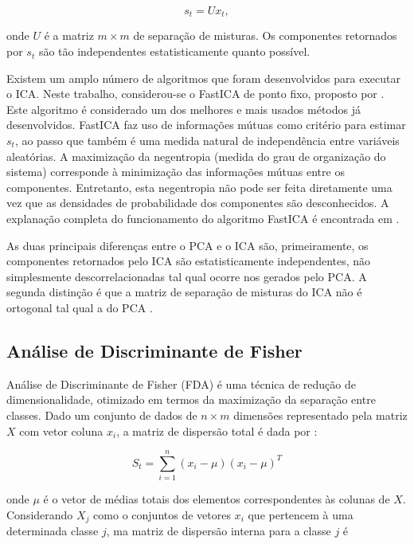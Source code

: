 \begin{equation}\label{eq:ica1}
{s_t} = {U}{x_t},
\end{equation}

\noindent onde $U$ é a matriz $m \times m$ de separação de misturas. Os componentes retornados por $s_t$ são tão independentes estatisticamente quanto possível.

Existem um amplo número de algoritmos que foram desenvolvidos para executar o ICA. Neste trabalho, considerou-se o FastICA de ponto fixo, proposto por . Este algoritmo é considerado um dos melhores e mais usados métodos já desenvolvidos. FastICA faz uso de informações mútuas como critério para estimar $s_t$, ao passo que também é uma medida natural de independência entre variáveis aleatórias. A maximização da negentropia (medida do grau de organização do sistema) corresponde à minimização das informações mútuas entre os componentes. Entretanto, esta negentropia não pode ser feita diretamente uma vez que as densidades de probabilidade dos componentes são desconhecidos. A explanação completa do funcionamento do algoritmo FastICA é encontrada em \cite{koldovsky2006efficient}.

As duas principais diferenças entre o PCA e o ICA são, primeiramente, os componentes retornados pelo ICA são estatisticamente independentes, não simplesmente descorrelacionadas tal qual ocorre nos gerados pelo PCA. A segunda distinção é que a matriz  de separação de misturas do ICA não é ortogonal tal qual a do PCA \cite{cao2003comparison}.

\subsection{Análise de Discriminante de Fisher}

Análise de Discriminante de Fisher (FDA) é uma técnica de redução de dimensionalidade, otimizado em termos da maximização da separação entre classes. Dado um conjunto de dados de $n \times m$ dimensões representado pela matriz $X$ com vetor coluna $x_i$, a matriz de dispersão total é dada por \cite{CHIANG20041389}:

\begin{equation}
S_t=\sum_{i=1}^{n}(x_i - \mu)(x_i - \mu)^T
\end{equation}

\noindent onde $\mu$ é o vetor de médias totais dos elementos correspondentes às colunas de $X$. Considerando $X_j$ como o conjuntos de vetores $x_i$ que pertencem à uma determinada classe $j$, ma matriz de dispersão interna para a classe $j$ é

